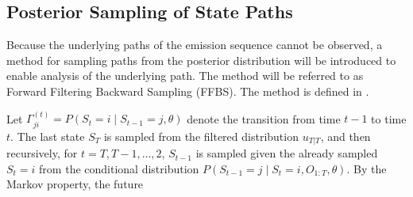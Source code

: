\subsection{Posterior Sampling of State Paths}
Because the underlying paths of the emission sequence cannot be observed, a method for sampling paths 
from the posterior distribution will be introduced to enable analysis of the underlying path. 
The method will be referred to as Forward Filtering Backward Sampling (FFBS). The method is defined in
\textcite[Sec.~7.1.2]{zucchini2016}. 
\bigskip

%
%
%
Let $\Gamma^{(t)}_{ji} = P(S_t = i \mid S_{t-1} = j, \theta)$ denote the transition
from time $t-1$ to time $t$. The last state $S_T$ is sampled from the filtered
distribution $u_{T|T}$, and then recursively, for $t = T, T-1, \dots, 2$,
$S_{t-1}$ is sampled given the already sampled $S_t = i$ from the conditional distribution
$P(S_{t-1} = j \mid S_t = i, O_{1:T}, \theta)$. By the Markov property, the future
